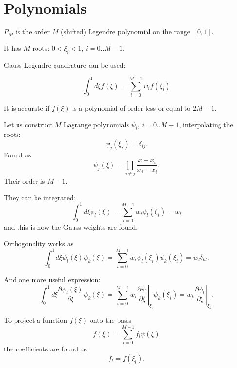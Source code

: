 \documentclass{article}
\newcommand{\D}[2]{\frac{\partial #1}{\partial #2}}
\begin{document}

\section{Polynomials}

$P_M$ is the order $M$ (shifted) Legendre polynomial on the range $[0,1]$.

It has $M$ roots: $0<\xi_i<1$, $i=0..M-1$.

Gauss Legendre quadrature can be used:

\begin{equation} \label{eq:gaussq}
  \int_0^1 d\xi f(\xi) = \sum_{i=0}^{M-1} w_i f(\xi_i) 
\end{equation}

It is accurate if $f(\xi)$ is a polynomial of order less or equal to $2M-1$. 

Let us construct $M$ Lagrange polynomials $\psi_i$, $i=0..M-1$, interpolating the roots:
\begin{equation}
  \psi_j(\xi_i) = \delta_{ij}.
\end{equation}
Found as
\begin{equation}
  \psi_j(\xi) = \prod_{i\ne j} \frac{x-x_i}{x_j-x_i}.
\end{equation}
Their order is $M-1$.

They can be integrated:
\begin{equation}
  \int_0^1 d\xi \psi_l(\xi) = \sum_{i=0}^{M-1} w_i \psi_l(\xi_i)  = w_l
\end{equation}
and this is how the Gauss weights are found. 

Orthogonality works as
\begin{equation}
  \int_0^1 d\xi \psi_l(\xi) \psi_k(\xi) = \sum_{i=0}^{M-1} w_i \psi_l(\xi_i) \psi_k(\xi_i) = w_l \delta_{kl}.
\end{equation}

And one more useful expression:
\begin{equation}
  \int_0^1 d\xi \D{\psi_l(\xi)}\xi \psi_k(\xi) = \sum_{i=0}^{M-1} w_i \left. \D{\psi_l}{\xi}\right|_{\xi_i} \psi_k(\xi_i) = w_k \left. \D{\psi_l}{\xi}\right|_{\xi_k}.
\end{equation}

To project a function $f(\xi)$ onto the basis
\begin{equation}
  f(\xi) = \sum_{l=0}^{M-1} f_l \psi(\xi) 
\end{equation}
the coefficients are found as
\begin{equation}
  \label{eq:takerootvalue}
  f_l = f(\xi_l).
\end{equation}
\end{document}
